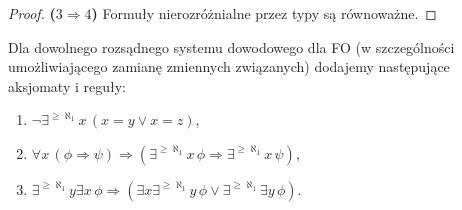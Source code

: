 \documentclass{article}
\begin{document}
\begin{proof}
	\textbf{($3 \Rightarrow 4$)}
	Formuły nierozróżnialne przez typy są równoważne.
\end{proof}



\begin{df}
	 Dla dowolnego rozsądnego systemu dowodowego dla FO (w szczególności umożliwiającego zamianę zmiennych związanych)
	 dodajemy następujące aksjomaty i reguły:
	 \begin{enumerate}
		 \item $\neg \exists^{\geq \aleph_1} x \, (x = y \vee x = z)$,
		 \item $\forall x \,(\phi \Rightarrow \psi) \Rightarrow (\exists^{\geq \aleph_1} x \, \phi \Rightarrow \exists^{\geq \aleph_1} x \, \psi)$,
		 \item $\exists^{\geq \aleph_1} y \exists x \, \phi \Rightarrow (\exists x \exists^{\geq \aleph_1} y \, \phi \vee \exists^{\geq \aleph_1} \exists y \, \phi)$.
	 \end{enumerate}

\end{df}
\end{document}
